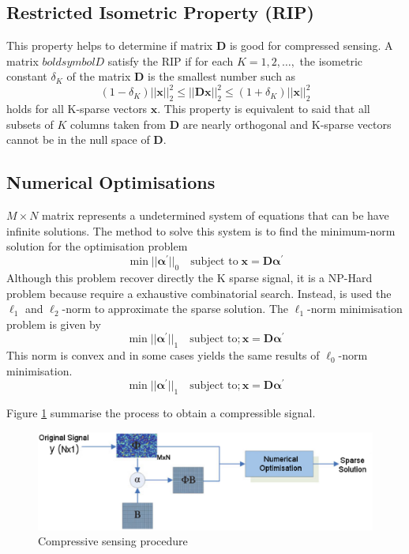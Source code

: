 \subsection{Restricted Isometric Property (RIP)}

This property helps to determine if matrix $\boldsymbol{D}$ is good for compressed sensing. A matrix $boldsymbol{D}$ satisfy the RIP if for each $K = 1,2, \ldots,$ the isometric constant $\delta_K$ of the matrix $\boldsymbol{D}$ is the smallest number such as
\begin{equation}
(1-\delta_K)||\boldsymbol{x}||_2^2 \leq ||\boldsymbol{Dx}||^2_2 \leq (1+\delta_K)||\boldsymbol{x}||^2_2
\end{equation}
holds for all K-sparse vectors $\boldsymbol{x}$. This property is equivalent to said that all subsets of $K$ columns taken from $\boldsymbol{D}$ are nearly orthogonal and K-sparse vectors cannot be in the null space
of $\boldsymbol{D}$.

\subsection{Numerical Optimisations}

$M \times N$ matrix represents a undetermined system of equations that can be have infinite solutions. The method to solve this system is to find the minimum-norm solution for the optimisation problem 
\begin{equation}
\min||\boldsymbol{\alpha^\prime}||_0 \quad \textrm{subject to} \; \boldsymbol{x} = \boldsymbol{D \alpha^\prime}
\end{equation}
Although this problem recover directly the K sparse signal, it is a NP-Hard problem because require a exhaustive combinatorial search. Instead, is used the $\ell_1$ and $\ell_2$-norm to approximate the sparse solution. The $\ell_1$-norm minimisation problem is given by
\begin{equation}
\min||\boldsymbol{\alpha^\prime}||_1 \quad \textrm{subject to}; \boldsymbol{x} = \boldsymbol{D \alpha^\prime}
\end{equation}
This norm is convex and in some cases yields the same results of $\ell_0$-norm minimisation.
\begin{equation}
\min||\boldsymbol{\alpha^\prime}||_1 \quad \textrm{subject to}; \boldsymbol{x} = \boldsymbol{D \alpha^\prime}
\end{equation}

Figure \ref{fig:compressive} summarise the process to obtain a compressible signal.
\begin{figure}[!h]
\centering
\includegraphics[width=\textwidth]{images/sparse.eps}
\caption[Compressive sensing procedure]{Compressive sensing procedure \cite{compressive}}
\label{fig:compressive}
\end{figure}


